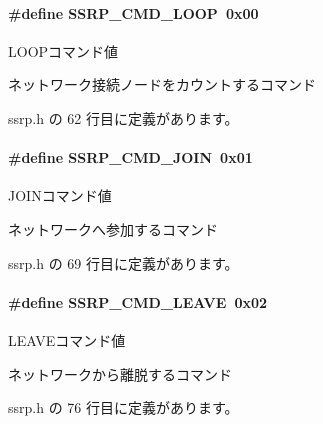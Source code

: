 \paragraph[{S\+S\+R\+P\+\_\+\+C\+M\+D\+\_\+\+L\+O\+O\+P}]{\setlength{\rightskip}{0pt plus 5cm}\#define S\+S\+R\+P\+\_\+\+C\+M\+D\+\_\+\+L\+O\+O\+P~0x00}\label{ssrp_8h_aa1031b596776a63602e2df610c63a148_aa1031b596776a63602e2df610c63a148}


L\+O\+O\+Pコマンド値 

ネットワーク接続ノードをカウントするコマンド 

 ssrp.\+h の 62 行目に定義があります。

\paragraph[{S\+S\+R\+P\+\_\+\+C\+M\+D\+\_\+\+J\+O\+I\+N}]{\setlength{\rightskip}{0pt plus 5cm}\#define S\+S\+R\+P\+\_\+\+C\+M\+D\+\_\+\+J\+O\+I\+N~0x01}\label{ssrp_8h_ababd7808112858fa10ac7143a748ea51_ababd7808112858fa10ac7143a748ea51}


J\+O\+I\+Nコマンド値 

ネットワークへ参加するコマンド 

 ssrp.\+h の 69 行目に定義があります。

\paragraph[{S\+S\+R\+P\+\_\+\+C\+M\+D\+\_\+\+L\+E\+A\+V\+E}]{\setlength{\rightskip}{0pt plus 5cm}\#define S\+S\+R\+P\+\_\+\+C\+M\+D\+\_\+\+L\+E\+A\+V\+E~0x02}\label{ssrp_8h_a5a91c530f07fd0d850782c090238634e_a5a91c530f07fd0d850782c090238634e}


L\+E\+A\+V\+Eコマンド値 

ネットワークから離脱するコマンド 

 ssrp.\+h の 76 行目に定義があります。

